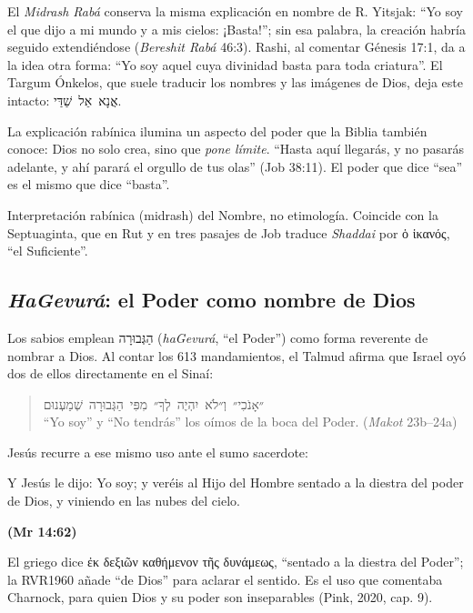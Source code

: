 \documentclass[11pt,letterpaper]{article}
\newcommand{\heb}[1]{\mbox{\foreignlanguage{hebrew}{#1}}}
\newcommand{\grc}[1]{\foreignlanguage{ancientgreek}{#1}}
\newcommand{\fuente}[1]{\par\hfill{\upshape\bfseries\small\textcolor{azul}{#1}}}
\begin{document}
El \emph{Midrash Rabá} conserva la misma explicación en nombre de R. Yitsjak: ``Yo soy el que dijo a mi mundo y a mis cielos: ¡Basta!''; sin esa palabra, la creación habría seguido extendiéndose (\emph{Bereshit Rabá} 46:3). Rashi, al comentar Génesis 17:1, da a la idea otra forma: ``Yo soy aquel cuya divinidad basta para toda criatura''. El Targum Ónkelos, que suele traducir los nombres y las imágenes de Dios, deja este intacto: \heb{אֲנָא אֵל שַׁדַּי}.

La explicación rabínica ilumina un aspecto del poder que la Biblia también conoce: Dios no solo crea, sino que \emph{pone límite}. ``Hasta aquí llegarás, y no pasarás adelante, y ahí parará el orgullo de tus olas'' (Job 38:11). El poder que dice ``sea'' es el mismo que dice ``basta''.

\begin{nota}[Precisión]
Interpretación rabínica (midrash) del Nombre, no etimología. Coincide con la Septuaginta, que en Rut y en tres pasajes de Job traduce \emph{Shaddai} por \grc{ὁ ἱκανός}, ``el Suficiente''.
\end{nota}

\subsection{\emph{HaGevurá}: el Poder como nombre de Dios}

Los sabios emplean \heb{הַגְּבוּרָה} (\emph{haGevurá}, ``el Poder'') como forma reverente de nombrar a Dios. Al contar los 613 mandamientos, el Talmud afirma que Israel oyó dos de ellos directamente en el Sinaí:

\begin{quote}\small
\heb{״אָנֹכִי״ וְ״לֹא יִהְיֶה לְךָ״ מִפִּי הַגְּבוּרָה שְׁמַעְנוּם}\\
``Yo soy'' y ``No tendrás'' los oímos de la boca del Poder. (\emph{Makot} 23b--24a)
\end{quote}

Jesús recurre a ese mismo uso ante el sumo sacerdote:

\begin{cita}Y Jesús le dijo: Yo soy; y veréis al Hijo del Hombre sentado a la diestra del poder de Dios, y viniendo en las nubes del cielo.\fuente{(Mr 14:62)}\end{cita}

El griego dice \grc{ἐκ δεξιῶν καθήμενον τῆς δυνάμεως}, ``sentado a la diestra del Poder''; la RVR1960 añade ``de Dios'' para aclarar el sentido. Es el uso que comentaba Charnock, para quien Dios y su poder son inseparables (Pink, 2020, cap. 9).
\end{document}
